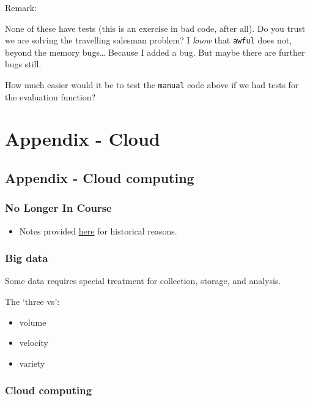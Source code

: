 Remark:

None of these have tests (this is an exercise in bad code, after all).
Do you trust we are solving the travelling salesman problem? I
\emph{know} that \texttt{awful} does not, beyond the memory bugs\ldots{}
Because I added a bug. But maybe there are further bugs still.

How much easier would it be to test the \texttt{manual} code above if we
had tests for the evaluation function?

\section{Appendix - Cloud}\label{appendix---cloud}

\subsection{Appendix - Cloud
computing}\label{appendix---cloud-computing}

\subsubsection{No Longer In Course}\label{no-longer-in-course-3}

\begin{itemize}
\itemsep1pt\parskip0pt
\item
  Notes provided \href{sec01cloud}{here} for historical reasons.
\end{itemize}

\subsubsection{Big data}\label{big-data}

Some data requires special treatment for collection, storage, and
analysis.

The `three vs':

\begin{itemize}
\itemsep1pt\parskip0pt
\item
  volume
\item
  velocity
\item
  variety
\end{itemize}

\subsubsection{Cloud computing}\label{cloud-computing}

